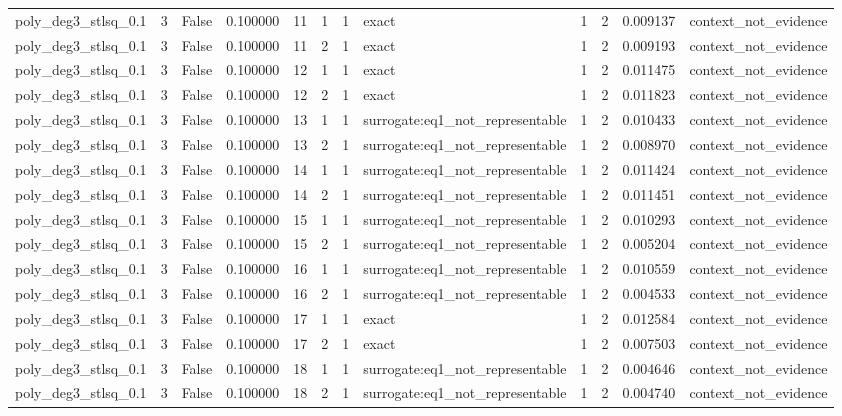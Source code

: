 \begin{tabular}{lrrrrrrlrrrl}
poly\_deg3\_stlsq\_0.1 & 3 & False & 0.100000 & 11 & 1 & 1 & exact & 1 & 2 & 0.009137 & context\_not\_evidence \\
poly\_deg3\_stlsq\_0.1 & 3 & False & 0.100000 & 11 & 2 & 1 & exact & 1 & 2 & 0.009193 & context\_not\_evidence \\
poly\_deg3\_stlsq\_0.1 & 3 & False & 0.100000 & 12 & 1 & 1 & exact & 1 & 2 & 0.011475 & context\_not\_evidence \\
poly\_deg3\_stlsq\_0.1 & 3 & False & 0.100000 & 12 & 2 & 1 & exact & 1 & 2 & 0.011823 & context\_not\_evidence \\
poly\_deg3\_stlsq\_0.1 & 3 & False & 0.100000 & 13 & 1 & 1 & surrogate:eq1\_not\_representable & 1 & 2 & 0.010433 & context\_not\_evidence \\
poly\_deg3\_stlsq\_0.1 & 3 & False & 0.100000 & 13 & 2 & 1 & surrogate:eq1\_not\_representable & 1 & 2 & 0.008970 & context\_not\_evidence \\
poly\_deg3\_stlsq\_0.1 & 3 & False & 0.100000 & 14 & 1 & 1 & surrogate:eq1\_not\_representable & 1 & 2 & 0.011424 & context\_not\_evidence \\
poly\_deg3\_stlsq\_0.1 & 3 & False & 0.100000 & 14 & 2 & 1 & surrogate:eq1\_not\_representable & 1 & 2 & 0.011451 & context\_not\_evidence \\
poly\_deg3\_stlsq\_0.1 & 3 & False & 0.100000 & 15 & 1 & 1 & surrogate:eq1\_not\_representable & 1 & 2 & 0.010293 & context\_not\_evidence \\
poly\_deg3\_stlsq\_0.1 & 3 & False & 0.100000 & 15 & 2 & 1 & surrogate:eq1\_not\_representable & 1 & 2 & 0.005204 & context\_not\_evidence \\
poly\_deg3\_stlsq\_0.1 & 3 & False & 0.100000 & 16 & 1 & 1 & surrogate:eq1\_not\_representable & 1 & 2 & 0.010559 & context\_not\_evidence \\
poly\_deg3\_stlsq\_0.1 & 3 & False & 0.100000 & 16 & 2 & 1 & surrogate:eq1\_not\_representable & 1 & 2 & 0.004533 & context\_not\_evidence \\
poly\_deg3\_stlsq\_0.1 & 3 & False & 0.100000 & 17 & 1 & 1 & exact & 1 & 2 & 0.012584 & context\_not\_evidence \\
poly\_deg3\_stlsq\_0.1 & 3 & False & 0.100000 & 17 & 2 & 1 & exact & 1 & 2 & 0.007503 & context\_not\_evidence \\
poly\_deg3\_stlsq\_0.1 & 3 & False & 0.100000 & 18 & 1 & 1 & surrogate:eq1\_not\_representable & 1 & 2 & 0.004646 & context\_not\_evidence \\
poly\_deg3\_stlsq\_0.1 & 3 & False & 0.100000 & 18 & 2 & 1 & surrogate:eq1\_not\_representable & 1 & 2 & 0.004740 & context\_not\_evidence \\

\end{tabular}
